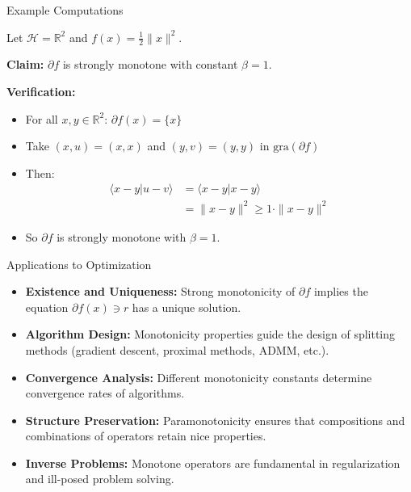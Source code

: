 \documentclass[aspectratio=169,10pt]{beamer}
\begin{document}
\begin{frame}{Example Computations}
    \begin{example}
        Let $\mathcal{H} = \mathbb{R}^2$ and $f(x) = \frac{1}{2}\|x\|^2$.

        \textbf{Claim:} $\partial f$ is strongly monotone with constant $\beta = 1$.

        \textbf{Verification:}
        \begin{itemize}
            \item For all $x, y \in \mathbb{R}^2$: $\partial f(x) = \{x\}$
            \item Take $(x, u) = (x, x)$ and $(y, v) = (y, y)$ in $\text{gra}(\partial f)$
            \item Then:
                \begin{align}
                    \langle x - y | u - v \rangle &= \langle x - y | x - y \rangle \\
                    &= \|x - y\|^2 \geq 1 \cdot \|x - y\|^2
                \end{align}
            \item So $\partial f$ is strongly monotone with $\beta = 1$.
        \end{itemize}
    \end{example}
\end{frame}

\begin{frame}{Applications to Optimization}
    \begin{itemize}
        \item \textbf{Existence and Uniqueness:} Strong monotonicity of $\partial f$ implies
              the equation $\partial f(x) \ni r$ has a unique solution.

        \item \textbf{Algorithm Design:} Monotonicity properties guide the design of
              splitting methods (gradient descent, proximal methods, ADMM, etc.).

        \item \textbf{Convergence Analysis:} Different monotonicity constants determine
              convergence rates of algorithms.

        \item \textbf{Structure Preservation:} Paramonotonicity ensures that compositions
              and combinations of operators retain nice properties.

        \item \textbf{Inverse Problems:} Monotone operators are fundamental in
              regularization and ill-posed problem solving.
    \end{itemize}
\end{frame}
\end{document}
